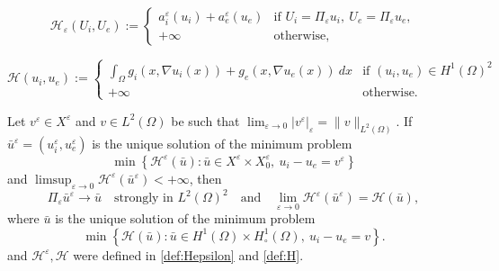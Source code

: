 \documentclass[10pt,a4paper]{amsart}
\newcommand{\e}{\varepsilon}
\begin{document}
\begin{equation}
	\label{def:Hepsilon}
	\mathcal{H}_\e(U_i,U_e):=
	\begin{cases}
		a_i^\e(u_i)+a_e^\e(u_e) &\text{if } U_i=\Pi_\e u_i,\ U_e=\Pi_\e u_e, \\
		+\infty &\text{otherwise,}
	\end{cases}
\end{equation}

	\begin{equation}
		\label{def:H}
		\mathcal{H}(u_i,u_e):=
		\begin{cases}
			\displaystyle \int_\Omega g_i(x,\nabla u_i(x)) +g_e(x,\nabla u_e(x))\ d x &\text{if } (u_i,u_e)\in H^1(\Omega)^2 \\
			+\infty &\text{otherwise.}
		\end{cases}
	\end{equation}

\begin{corollary}
\label{cor:minimizers}
Let $v^\e \in X^\e$ and $v\in L^2(\Omega)$ be such that
\(
\lim_{\e \to 0}|v^\e|_\e = \|v\|_{L^2(\Omega)}.
\) 
If $\bar u^\e = (u_i^\e,u_e^\e)$ is the unique solution of the minimum problem
\[
\min \left\{ \mathcal{H}^\e(\bar u): \bar u \in X^\e \times X_0^\e,\ u_i-u_e = v^\e \right\} 
\]
and $\limsup_{\e\to 0} \mathcal{H}^\e(\bar u^\e)<+\infty$, then
\[
\Pi_\e \bar u^\e \to \bar u\quad \text{strongly in }L^2(\Omega)^2\quad 
\text{and}\quad  \lim_{\e \to 0}\mathcal{H}^\e(\bar u^\e)=\mathcal{H}(\bar u),
\]
where $\bar u$ is the unique solution of the minimum problem
\[
\min \left\{ \mathcal{H}(\bar u): \bar u \in H^1(\Omega) \times H^1_\circ(\Omega),\ u_i-u_e = v \right\}.
\]
and $\mathcal{H}^\e,\mathcal{H}$ were defined in \eqref{def:Hepsilon} and \eqref{def:H}.
\end{corollary}
\end{document}
